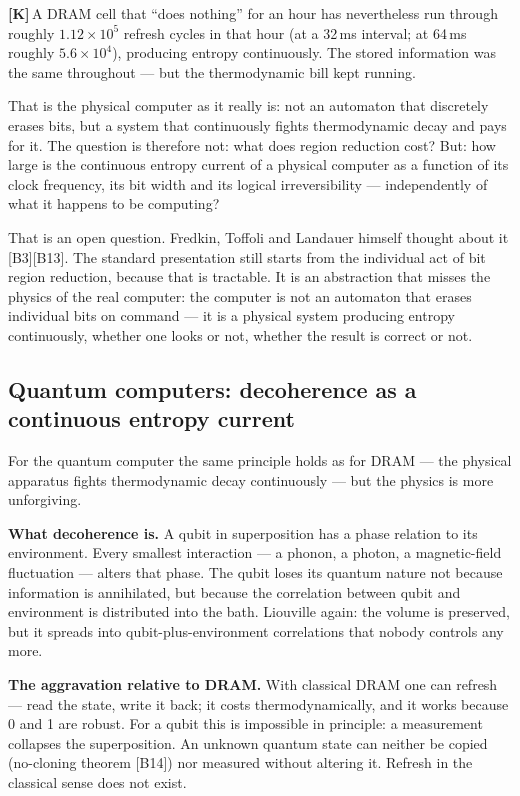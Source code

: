 \documentclass[11pt,a4paper]{article}
\newcommand{\LK}{\textcolor{layK}{\textbf{\footnotesize\textsf{[K]}}}\,}
\begin{document}
\LK A DRAM cell that “does nothing” for an hour has nevertheless run through
roughly $1.12\times10^{5}$ refresh cycles in that hour (at a 32\,ms interval; at
64\,ms roughly $5.6\times10^{4}$), producing entropy continuously. The stored
information was the same throughout --- but the thermodynamic bill kept running.

That is the physical computer as it really is: not an automaton that discretely
erases bits, but a system that continuously fights thermodynamic decay and pays
for it. The question is therefore not: what does region reduction cost? But: how
large is the continuous entropy current of a physical computer as a function of
its clock frequency, its bit width and its logical irreversibility ---
independently of what it happens to be computing?

That is an open question. Fredkin, Toffoli and Landauer himself thought about it
[B3][B13]. The standard presentation still starts from the individual act of bit
region reduction, because that is tractable. It is an abstraction that misses the
physics of the real computer: the computer is not an automaton that erases
individual bits on command --- it is a physical system producing entropy
continuously, whether one looks or not, whether the result is correct or not.

\subsection{Quantum computers: decoherence as a continuous entropy current}

For the quantum computer the same principle holds as for DRAM --- the physical
apparatus fights thermodynamic decay continuously --- but the physics is more
unforgiving.

\textbf{What decoherence is.} A qubit in superposition has a phase relation to its
environment. Every smallest interaction --- a phonon, a photon, a magnetic-field
fluctuation --- alters that phase. The qubit loses its quantum nature not because
information is annihilated, but because the correlation between qubit and
environment is distributed into the bath. Liouville again: the volume is
preserved, but it spreads into qubit-plus-environment correlations that nobody
controls any more.

\textbf{The aggravation relative to DRAM.} With classical DRAM one can refresh ---
read the state, write it back; it costs thermodynamically, and it works because 0
and 1 are robust. For a qubit this is impossible in principle: a measurement
collapses the superposition. An unknown quantum state can neither be copied
(no-cloning theorem [B14]) nor measured without altering it. Refresh in the
classical sense does not exist.
\end{document}
